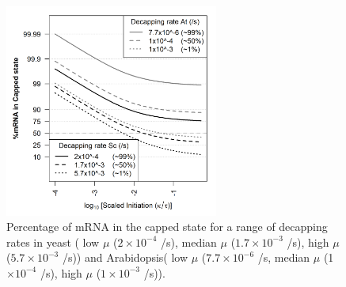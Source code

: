 \documentclass[a4,center,fleqn,nocrop]{NAR}
\begin{document}


\begin{figure}[!ht]
\begin{center}
\includegraphics[width=70mm]{Images/2023-07-28_logodds.png}
\caption{Percentage of mRNA in the capped state for a range of decapping rates in yeast ( low $\mu$ ($2\times 10^{-4}$ /s), median $\mu$ ($1.7\times 10^{-3}$ /s), high $\mu$ ($5.7\times 10^{-3}$ /s)) and Arabidopsis( low $\mu$ ($7.7\times 10^{-6}$ /s, median $\mu$ (1$\times 10^{-4}$ /s), high $\mu$ ($1\times 10^{-3}$ /s)). }
\end{center}
\end{figure}
\end{document}
